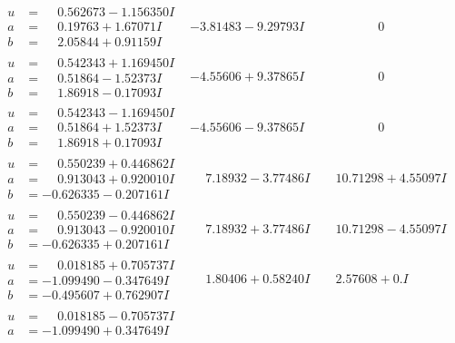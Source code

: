 \documentclass[1p]{elsarticle_modified}
\theoremstyle{definition}
\begin{document}
$$\begin{array}{c|c|c}
\begin{aligned}
u &= \phantom{-}0.562673 - 1.156350 I \\
a &= \phantom{-}0.19763 + 1.67071 I \\
b &= \phantom{-}2.05844 + 0.91159 I\end{aligned}
 & -3.81483 - 9.29793 I & \phantom{-0.000000 } 0 \\ \hline\begin{aligned}
u &= \phantom{-}0.542343 + 1.169450 I \\
a &= \phantom{-}0.51864 - 1.52373 I \\
b &= \phantom{-}1.86918 - 0.17093 I\end{aligned}
 & -4.55606 + 9.37865 I & \phantom{-0.000000 } 0 \\ \hline\begin{aligned}
u &= \phantom{-}0.542343 - 1.169450 I \\
a &= \phantom{-}0.51864 + 1.52373 I \\
b &= \phantom{-}1.86918 + 0.17093 I\end{aligned}
 & -4.55606 - 9.37865 I & \phantom{-0.000000 } 0 \\ \hline\begin{aligned}
u &= \phantom{-}0.550239 + 0.446862 I \\
a &= \phantom{-}0.913043 + 0.920010 I \\
b &= -0.626335 - 0.207161 I\end{aligned}
 & \phantom{-}7.18932 - 3.77486 I & \phantom{-}10.71298 + 4.55097 I \\ \hline\begin{aligned}
u &= \phantom{-}0.550239 - 0.446862 I \\
a &= \phantom{-}0.913043 - 0.920010 I \\
b &= -0.626335 + 0.207161 I\end{aligned}
 & \phantom{-}7.18932 + 3.77486 I & \phantom{-}10.71298 - 4.55097 I \\ \hline\begin{aligned}
u &= \phantom{-}0.018185 + 0.705737 I \\
a &= -1.099490 - 0.347649 I \\
b &= -0.495607 + 0.762907 I\end{aligned}
 & \phantom{-}1.80406 + 0.58240 I & \phantom{-}2.57608 + 0. I\phantom{ +0.000000I} \\ \hline\begin{aligned}
u &= \phantom{-}0.018185 - 0.705737 I \\
a &= -1.099490 + 0.347649 I \\

\end{aligned}
\end{array}$$
\end{document}
